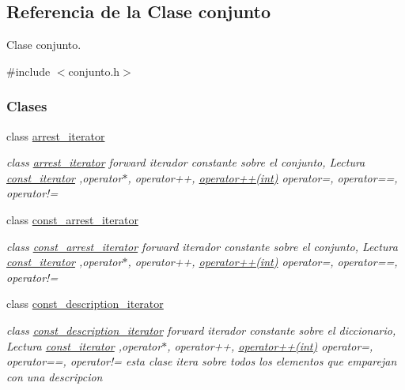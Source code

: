 \hypertarget{classconjunto}{\subsection{Referencia de la Clase conjunto}
\label{classconjunto}
}


Clase conjunto.  




{\ttfamily \#include $<$conjunto.\-h$>$}

\subsubsection*{Clases}
\begin{DoxyCompactItemize}
\item 
class \hyperlink{classconjunto_1_1arrest__iterator}{arrest\-\_\-iterator}
\begin{DoxyCompactList}\small\item\em class \hyperlink{classconjunto_1_1arrest__iterator}{arrest\-\_\-iterator} forward iterador constante sobre el conjunto, Lectura \hyperlink{classconjunto_1_1const__iterator}{const\-\_\-iterator} ,operator$\ast$, operator++, \hyperlink{classconjunto_1_1arrest__iterator_a9f350bb37bcac3754df9c13d856ee56c}{operator++(int)} operator=, operator==, operator!= \end{DoxyCompactList}\item 
class \hyperlink{classconjunto_1_1const__arrest__iterator}{const\-\_\-arrest\-\_\-iterator}
\begin{DoxyCompactList}\small\item\em class \hyperlink{classconjunto_1_1const__arrest__iterator}{const\-\_\-arrest\-\_\-iterator} forward iterador constante sobre el conjunto, Lectura \hyperlink{classconjunto_1_1const__iterator}{const\-\_\-iterator} ,operator$\ast$, operator++, \hyperlink{classconjunto_1_1const__arrest__iterator_abd10935467e56b74188eacc8b5cebe60}{operator++(int)} operator=, operator==, operator!= \end{DoxyCompactList}\item 
class \hyperlink{classconjunto_1_1const__description__iterator}{const\-\_\-description\-\_\-iterator}
\begin{DoxyCompactList}\small\item\em class \hyperlink{classconjunto_1_1const__description__iterator}{const\-\_\-description\-\_\-iterator} forward iterador constante sobre el diccionario, Lectura \hyperlink{classconjunto_1_1const__iterator}{const\-\_\-iterator} ,operator$\ast$, operator++, \hyperlink{classconjunto_1_1const__description__iterator_a6e102f59a677e3bf43aec62609531b11}{operator++(int)} operator=, operator==, operator!= esta clase itera sobre todos los elementos que emparejan con una descripcion \end{DoxyCompactList}\item 

\end{DoxyCompactItemize}
